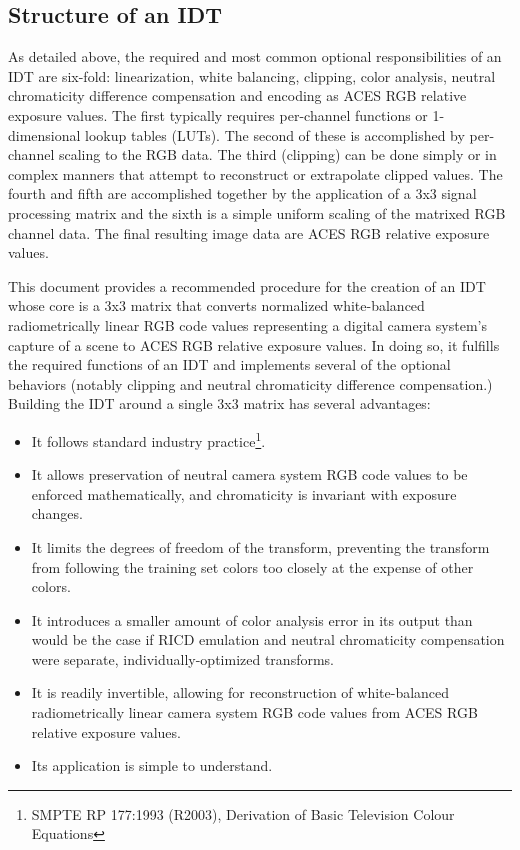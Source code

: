 \subsection{Structure of an IDT}
As detailed above, the required and most common optional responsibilities of an IDT are six-fold: linearization, white balancing, clipping, color analysis, neutral chromaticity difference compensation and encoding as ACES RGB relative exposure values. The first typically requires per-channel functions or 1-dimensional lookup tables (LUTs). The second of these is accomplished by per-channel scaling to the RGB data. The third (clipping) can be done simply or in complex manners that attempt to reconstruct or extrapolate clipped values. The fourth and fifth are accomplished together by the application of a 3x3 signal processing matrix and the sixth is a simple uniform scaling of the matrixed RGB channel data. The final resulting image data are ACES RGB relative exposure values.

This document provides a recommended procedure for the creation of an IDT whose core is a 3x3 matrix that converts normalized white-balanced radiometrically linear RGB code values representing a digital camera system's capture of a scene to ACES RGB relative exposure values. In doing so, it fulfills the required functions of an IDT and implements several of the optional behaviors (notably clipping and neutral chromaticity difference compensation.) Building the IDT around a single 3x3 matrix has several advantages:

\begin{itemize}
    \item	It follows standard industry practice\footnote{SMPTE RP 177:1993 (R2003), Derivation of Basic Television Colour Equations}.
    \item  	It allows preservation of neutral camera system RGB code values to be enforced mathematically, and chromaticity is invariant with exposure changes.
    \item	It limits the degrees of freedom of the transform, preventing the transform from following the training set colors too closely at the expense of other colors.
    \item	It introduces a smaller amount of color analysis error in its output than would be the case if RICD emulation and neutral chromaticity compensation were separate, individually-optimized transforms.
    \item	It is readily invertible, allowing for reconstruction of white-balanced radiometrically linear camera system RGB code values from ACES RGB relative exposure values. 
    \item	Its application is simple to understand.
\end{itemize}

